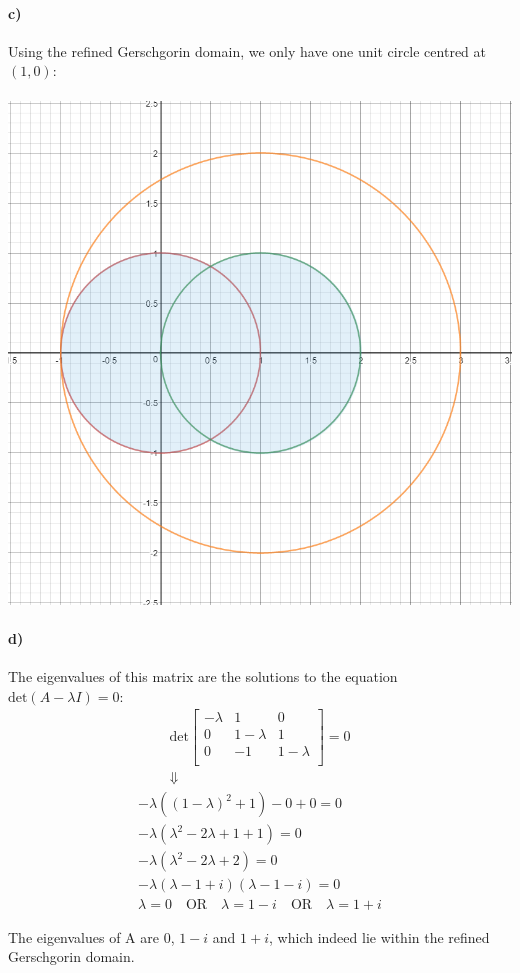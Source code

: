 \documentclass[10pt,letter]{article}
\begin{document}
\paragraph{c)} Using the refined Gerschgorin domain, we only have one unit circle centred at $(1, 0)$:
\\\\
\includegraphics[width=\textwidth,height=\textheight,keepaspectratio]{ps5problem5c.png}

\pagebreak

\paragraph{d)}

The eigenvalues of this matrix are the solutions to the equation $\textrm{det} (A - \lambda I) = 0$:
\begin{gather*}
\textrm{det}
\left[ {\begin{array}{ccc}
 -\lambda & 1 & 0 \\
 0 &  1-\lambda & 1 \\
 0 &  -1 & 1-\lambda \\
\end{array} } \right]
= 0
\\ \Downarrow
\end{gather*}
\begin{gather*}
-\lambda ((1 - \lambda)^2 + 1) - 0 + 0 = 0
\\
-\lambda (\lambda^2 - 2\lambda + 1 + 1) = 0
\\
-\lambda (\lambda^2 - 2\lambda + 2) = 0
\\
-\lambda (\lambda - 1 + i) (\lambda - 1 - i) = 0
\\
\lambda = 0 \quad \textrm{OR} \quad \lambda = 1 - i \quad \textrm{OR} \quad \lambda = 1 + i
\end{gather*}

The eigenvalues of A are $0$, $1-i$ and $1+i$, which indeed lie within the refined Gerschgorin domain.
\end{document}
